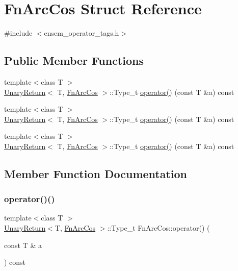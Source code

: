 \hypertarget{structFnArcCos}{}\section{Fn\+Arc\+Cos Struct Reference}
\label{structFnArcCos}


{\ttfamily \#include $<$ensem\+\_\+operator\+\_\+tags.\+h$>$}

\subsection*{Public Member Functions}
\begin{DoxyCompactItemize}
\item 
{\footnotesize template$<$class T $>$ }\\\mbox{\hyperlink{structUnaryReturn}{Unary\+Return}}$<$ T, \mbox{\hyperlink{structFnArcCos}{Fn\+Arc\+Cos}} $>$\+::Type\+\_\+t \mbox{\hyperlink{structFnArcCos_a1485eed840820589bafab9b8cc21c43d}{operator()}} (const T \&a) const
\item 
{\footnotesize template$<$class T $>$ }\\\mbox{\hyperlink{structUnaryReturn}{Unary\+Return}}$<$ T, \mbox{\hyperlink{structFnArcCos}{Fn\+Arc\+Cos}} $>$\+::Type\+\_\+t \mbox{\hyperlink{structFnArcCos_a1485eed840820589bafab9b8cc21c43d}{operator()}} (const T \&a) const
\item 
{\footnotesize template$<$class T $>$ }\\\mbox{\hyperlink{structUnaryReturn}{Unary\+Return}}$<$ T, \mbox{\hyperlink{structFnArcCos}{Fn\+Arc\+Cos}} $>$\+::Type\+\_\+t \mbox{\hyperlink{structFnArcCos_a1485eed840820589bafab9b8cc21c43d}{operator()}} (const T \&a) const
\end{DoxyCompactItemize}


\subsection{Member Function Documentation}
\mbox{\label{structFnArcCos_a1485eed840820589bafab9b8cc21c43d}} 
\subsubsection{\texorpdfstring{operator()()}{operator()()}\hspace{0.1cm}{\footnotesize\ttfamily [1/3]}}
{\footnotesize\ttfamily template$<$class T $>$ \\
\mbox{\hyperlink{structUnaryReturn}{Unary\+Return}}$<$T, \mbox{\hyperlink{structFnArcCos}{Fn\+Arc\+Cos}} $>$\+::Type\+\_\+t Fn\+Arc\+Cos\+::operator() (\begin{DoxyParamCaption}\item[{const T \&}]{a }\end{DoxyParamCaption}) const\hspace{0.3cm}{\ttfamily [inline]}}

